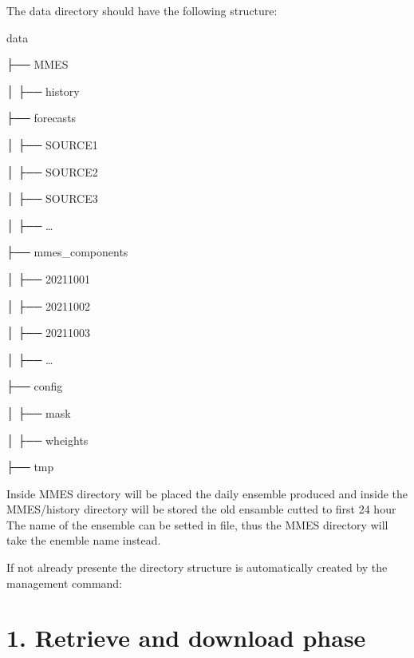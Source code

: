 \documentclass[letterpaper,10pt,english]{sphinxmanual}
\begin{document}
The data directory should have the following structure:

\begin{DUlineblock}{0em}
\item[] data
\item[] ├── MMES
\item[] │   ├── history
\item[] ├── forecasts
\item[] │   ├── SOURCE1
\item[] │   ├── SOURCE2
\item[] │   ├── SOURCE3
\item[] │   ├── …
\item[] ├── mmes\_components
\item[] │   ├── 20211001
\item[] │   ├── 20211002
\item[] │   ├── 20211003
\item[] │   ├── …
\item[] ├── config
\item[] │   ├── mask
\item[] │   ├── wheights
\item[] ├── tmp
\end{DUlineblock}

Inside MMES directory will be placed the daily ensemble produced and inside the MMES/history directory will be stored the old ensamble cutted to first 24 hour
The name of the ensemble can be setted in  file, thus the MMES directory will take the enemble name instead.

If not already presente the directory structure is automatically created by the management command:

\begin{sphinxVerbatim}[commandchars=\\\{\}]
  
\end{sphinxVerbatim}


\section{1. Retrieve and download phase}
\label{\detokenize{howitworks/index:retrieve-and-download-phase}}\begin{quote}

\begin{figure}[H]
\centering

\noindent{}
\end{figure}
\end{quote}
\end{document}
